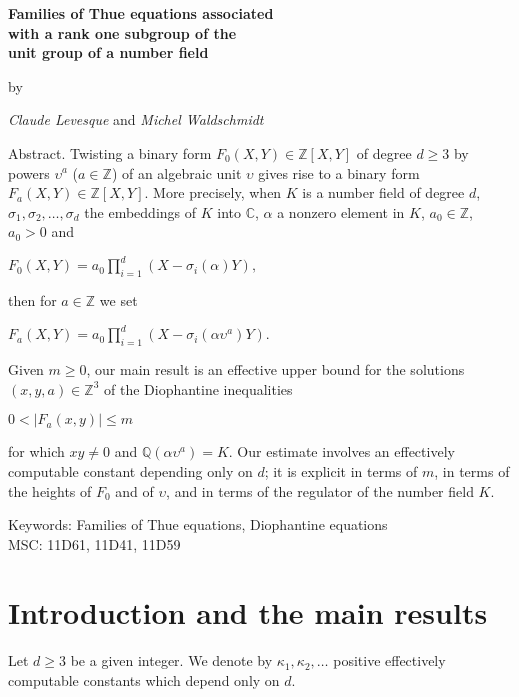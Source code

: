 \documentclass[leqno,11pt]{article}
\def\C{\mathbb{C}}
\def\Q{\mathbb{Q}}
\def\Z{\mathbb{Z}}
\begin{document}
 

 \begin{center}
 {\bf \Large
Families of Thue equations associated 
\\
with a 
rank one subgroup of the 
\\
unit group of a number field
\\

}

 \bigskip
{\large by}

 \bigskip
{ \it \Large
Claude Levesque } {\large and} {\it \Large
 Michel Waldschmidt
 }
 \end{center}\bigskip\medskip

{\sc Abstract.}
Twisting a binary form $F_0(X,Y)\in\Z[X,Y]$ of degree $d\ge 3$ by powers $\upsilon^a$ ($a\in\Z$) of an algebraic unit $\upsilon$ gives rise to a binary form $F_a(X,Y)\in\Z[X,Y]$. More precisely, when $K$ is a number field of degree $d$, $\sigma_1,\sigma_2,\dots,\sigma_d$ the embeddings of $K$ into $\C$, $\alpha$ a nonzero element in $K$, $a_0\in\Z$, $a_0>0$ and \\
\centerline{$
 F_0(X,Y)=a_0\displaystyle\prod_{i=1}^d (X-\sigma_i(\alpha) Y),
$}
then for $a\in\Z$ we set\\
\centerline{$
 F_a(X,Y)=\displaystyle a_0\prod_{i=1}^d (X-\sigma_i(\alpha\upsilon^a) Y).
 $}
 Given $m\ge 0$, our main result is an effective upper bound for the solutions $(x,y,a)\in\Z^3$ of the Diophantine inequalities\\
\vskip -3mm
\centerline{$
0<|F_a(x,y)|\le m
$}
\noindent for which $xy\not=0$ and $\Q(\alpha \upsilon^a)=K$.
Our estimate involves an effectively computable constant depending only on $d$; it is explicit in terms of $m$, in terms of the heights of $F_0$ and of $\upsilon$, and in terms of the regulator of the number field $K$.
\\

\par
\noindent
 {\sc Keywords:} Families of Thue equations, Diophantine equations
 \\
 {\sc MSC:} 11D61, 11D41, 11D59

\section{Introduction and the main results}\label{S:introduction}
 
Let $d\ge 3$ be a given integer. We denote by $\kappa_1,\kappa_2,\dots$ positive effectively computable constants which depend only on $d$.
\end{document}
